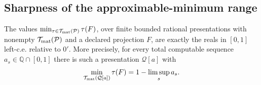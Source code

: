 \subsection{Sharpness of the approximable-minimum range}\label{sec:trace-range}
\begin{theorem}\label{thm:trace-range}
The values $\min_{\tau\in\mathcal T_{\rm mat}(\mathcal P)}\tau(F)$, over finite bounded rational presentations with nonempty $\mathcal T_{\rm mat}(\mathcal P)$ and a declared projection $F$, are exactly the reals in $[0,1]$ left-c.e. relative to $0'$. More precisely, for every total computable sequence $a_s\in\mathbb Q\cap[0,1]$ there is such a presentation $\mathcal Q[a]$ with
\begin{equation}\label{eq:limsup-minimum}
 \min_{\mathcal T_{\rm mat}(\mathcal Q[a])}\tau(F)=1-\limsup_s a_s.
\end{equation}
\end{theorem}
